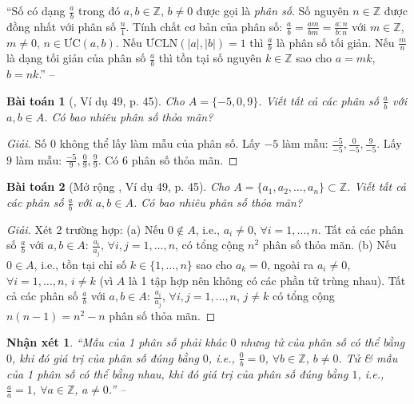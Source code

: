 \documentclass{article}
\newtheorem{baitoan}{Bài toán}
\newtheorem{nhanxet}{Nhận xét}
\begin{document}
``Số có dạng $\frac{a}{b}$ trong đó $a,b\in\mathbb{Z}$, $b\ne0$ được gọi là \textit{phân số}. Số nguyên $n\in\mathbb{Z}$ được đồng nhất với phân số $\frac{n}{1}$. Tính chất cơ bản của phân số: $\frac{a}{b} = \frac{am}{bm} = \frac{a:n}{b:n}$ với $m\in\mathbb{Z}$, $m\ne0$, $n\in\mbox{ƯC}(a,b)$. Nếu $\mbox{ƯCLN}(|a|,|b|) = 1$ thì $\frac{a}{b}$ là phân số tối giản. Nếu $\frac{m}{n}$ là dạng tối giản của phân số $\frac{a}{b}$ thì tồn tại số nguyên $k\in\mathbb{Z}$ sao cho $a = mk$, $b = nk$.'' -- \cite[Chap. III, \S1, p. 4]{Binh_Toan_6_tap_2}

\begin{baitoan}[\cite{Tuyen_Toan_6}, Ví dụ 49, p. 45]
	Cho $A = \{-5,0,9\}$. Viết tất cả các phân số $\frac{a}{b}$ với $a,b\in A$. Có bao nhiêu phân số thỏa mãn?
\end{baitoan}

\begin{proof}[Giải]
	Số $0$ không thể lấy làm mẫu của phân số. Lấy $-5$ làm mẫu: $\frac{-5}{-5},\frac{0}{-5},\frac{9}{-5}$. Lấy $9$ làm mẫu: $\frac{-5}{9},\frac{0}{9},\frac{9}{9}$. Có $6$ phân số thỏa mãn.
\end{proof}

\begin{baitoan}[Mở rộng \cite{Tuyen_Toan_6}, Ví dụ 49, p. 45]
	Cho $A = \{a_1,a_2,\ldots,a_n\}\subset\mathbb{Z}$. Viết tất cả các phân số $\frac{a}{b}$ với $a,b\in A$. Có bao nhiêu phân số thỏa mãn?
\end{baitoan}

\begin{proof}[Giải]
	Xét 2 trường hợp: (a) Nếu $0\notin A$, i.e., $a_i\ne0$, $\forall i = 1,\ldots,n$. Tất cả các phân số $\frac{a}{b}$ với $a,b\in A$: $\frac{a_i}{a_j}$, $\forall i,j = 1,\ldots,n$, có tổng cộng $n^2$ phân số thỏa mãn. (b) Nếu $0\in A$, i.e., tồn tại chỉ số $k\in\{1,\ldots,n\}$ sao cho $a_k = 0$, ngoài ra $a_i\ne 0$, $\forall i = 1,\ldots,n$, $i\ne k$ (vì $A$ là 1 tập hợp nên không có các phần tử trùng nhau). Tất cả các phân số $\frac{a}{b}$ với $a,b\in A$: $\frac{a_i}{a_j}$, $\forall i,j = 1,\ldots,n$, $j\ne k$ có tổng cộng $n(n - 1) = n^2 - n$ phân số thỏa mãn.
\end{proof}

\begin{nhanxet}
	``Mẫu của 1 phân số phải khác $0$ nhưng tử của phân số có thể bằng $0$, khi đó giá trị của phân số đúng bằng $0$, i.e., $\frac{0}{b} = 0$, $\forall b\in\mathbb{Z}$, $b\ne 0$. Tử \& mẫu của 1 phân số có thể bằng nhau, khi đó giá trị của phân số đúng bằng $1$, i.e., $\frac{a}{a} = 1$, $\forall a\in\mathbb{Z}$, $a\ne 0$.'' -- \cite[p. 46]{Tuyen_Toan_6}
\end{nhanxet}
\end{document}

